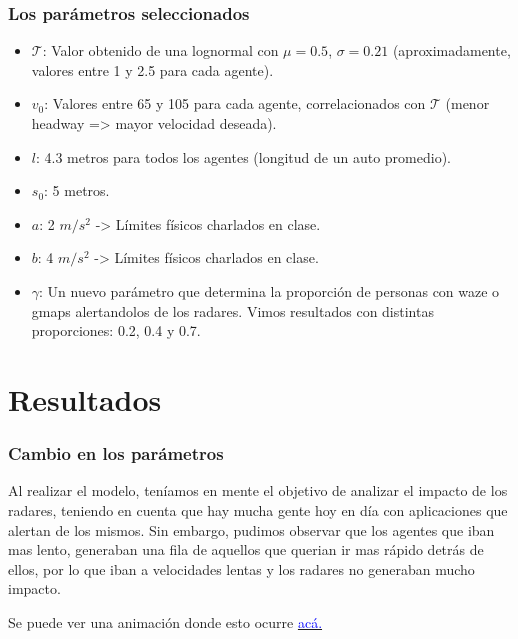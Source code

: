 \documentclass[10pt, compress]{beamer}
\begin{document}
\begin{frame}[fragile]

\frametitle{Los par\'ametros seleccionados}

\begin{itemize}

\item $\mathcal{T}$: Valor obtenido de una lognormal con $\mu = 0.5$, $\sigma = 0.21$ (aproximadamente, valores entre 1 y 2.5 para cada agente).
\item $v_0$: Valores entre 65 y 105 para cada agente, correlacionados con $\mathcal{T}$ (menor headway => mayor velocidad deseada).
\item $l$: 4.3 metros para todos los agentes (longitud de un auto promedio).
\item $s_0$: 5 metros.
\item $a$: 2 $m/s^2$ -> Límites físicos charlados en clase.
\item $b$: 4 $m/s^2$ -> Límites físicos charlados en clase.
\item $\gamma$: Un nuevo par\'ametro que determina la proporci\'on de personas con waze o gmaps alertandolos de los radares. Vimos resultados con distintas proporciones: 0.2, 0.4 y 0.7.

\end{itemize}

\end{frame}

\section{Resultados}

\begin{frame}
\frametitle{Cambio en los par\'ametros}

Al realizar el modelo, ten\'iamos en mente el objetivo de analizar el impacto de los radares, teniendo en cuenta que hay mucha gente hoy en d\'ia con aplicaciones que alertan de los mismos. Sin embargo, pudimos observar que los agentes que iban mas lento, generaban una fila de aquellos que querian ir mas r\'apido detr\'as de ellos, por lo que iban a velocidades lentas y los radares no generaban mucho impacto.

Se puede ver una animaci\'on donde esto ocurre \href{https://youtu.be/NnljPUTmnGE}{\textcolor{blue}{ac\'a.}}

\end{frame}
\end{document}
